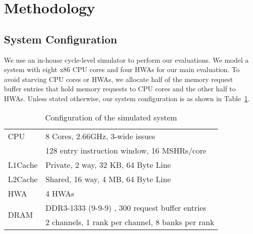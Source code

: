 \documentclass[10pt,letterpaper]{article}
\begin{document}
 \newcommand{\aloneipc}{\textrm{IPC}_{i}^{\scriptstyle{alone}}}
\newcommand{\sharedipc}{\textrm{IPC}_{i}^{\scriptstyle{shared}}}

\section{Methodology}
\label{sec:methodology}
\subsection{System Configuration}
We use an in-house cycle-level simulator to perform our evaluations. We model a
system with eight x86 CPU cores and four HWAs for our main evaluation. 
To avoid starving CPU cores or
HWAs, we allocate half of the memory request buffer entries that hold memory
requests to CPU cores and the other half to HWAs. Unless stated
otherwise, our system configuration is as shown in Table~\ref{sim_env}.

\begin{table}[h!]
\vspace{-3mm}
\footnotesize
  \centering
  \begin{tabular}{|l|l|}
    \hline
    CPU & 8 Cores, 2.66GHz, 3-wide issues\\
        &  128 entry instruction window, 16 MSHRs/core \\
    \hline
    L1Cache & Private, 2 way, 32 KB, 64 Byte Line \\
    \hline
    L2Cache & Shared, 16 way, 4 MB, 64 Byte Line \\
    \hline
    HWA & 4 HWAs \\
    \hline
    \multirow{2}{*}{\begin{minipage}{0.5in}DRAM\end{minipage}} & DDR3-1333
    (9-9-9) \cite{micron-ddr3}, 300 request buffer entries \\
    & 2 channels, 1 rank per channel, 8 banks per rank \\
    \hline
  \end{tabular}
  \vspace{-2mm}
  \caption{Configuration of the simulated system}
  \label{sim_env}
\end{table}
\vspace{-0.3in}
\end{document}
